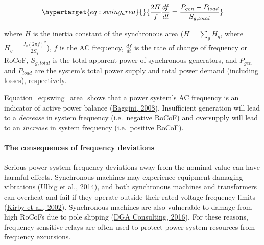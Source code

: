 \documentclass[12pt,a4paper,]{report}
\begin{document}
\begin{equation}\protect\hypertarget{eq:swing_area}{}{\frac{2H}{f}\frac{df}{dt} = \frac{P_{gen}-P_{load}}{S_{g, total}}}\label{eq:swing_area}\end{equation}

where \(H\) is the inertia constant of the synchronous area
(\(H=\sum_{g} H_g\), where \(H_g = \frac{J_g(2\pi f)^2}{2S_g}\)), \(f\)
is the AC frequency, \(\frac{df}{dt}\) is the rate of change of
frequency or RoCoF, \(S_{g,total}\) is the total apparent power of
synchronous generators, and \(P_{gen}\) and \(P_{load}\) are the
system's total power supply and total power demand (including losses),
respectively.

Equation~\ref{eq:swing_area} shows that a power system's AC frequency is
an indicator of active power balance
(\protect\hyperlink{ref-bagginiHandbookPowerQuality2008}{Baggini,
2008}). Insufficient generation will lead to a \emph{decrease} in system
frequency (i.e.~negative RoCoF) and oversupply will lead to an
\emph{increase} in system frequency (i.e.~positive RoCoF).

\hypertarget{sec:lit_review-balancing_need-consequences}{%
\paragraph{The consequences of frequency
deviations}\label{sec:lit_review-balancing_need-consequences}}

Serious power system frequency deviations away from the nominal value
can have harmful effects. Synchronous machines may experience
equipment-damaging vibrations
(\protect\hyperlink{ref-ulbigImpactLowRotational2014}{Ulbig et al.,
2014}), and both synchronous machines and transformers can overheat and
fail if they operate outside their rated voltage-frequency limits
(\protect\hyperlink{ref-kirbyFrequencyControlConcerns2002}{Kirby et al.,
2002}). Synchronous machines are also vulnerable to damage from high
RoCoFs due to pole slipping
(\protect\hyperlink{ref-dgaconsultingInternationalReviewFrequency2016}{DGA
Consulting, 2016}). For these reasons, frequency-sensitive relays are
often used to protect power system resources from frequency excursions.
\end{document}
